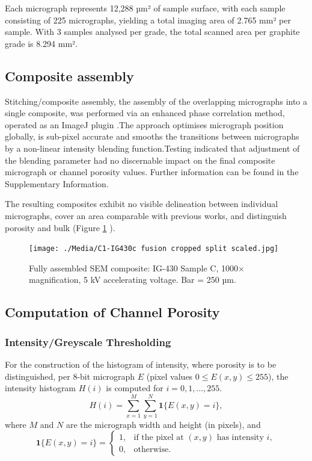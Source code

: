 \documentclass[review]{elsarticle}
\begin{document}
Each micrograph represents 12,288 µm² of sample surface, with each sample
consisting of 225 micrographs, yielding a total imaging area of 2.765 mm² per
sample. With 3 samples analysed per grade, the total scanned area per graphite
grade is 8.294 mm². 

\subsection{Composite assembly}

Stitching/composite assembly, the assembly of the overlapping micrographs into a
single composite, was performed via an enhanced phase correlation method,
operated as an ImageJ plugin \citep{ Preibisch2009}.The approach optimises
micrograph position globally, is sub-pixel accurate and smooths the transitions
between micrographs by a non-linear intensity blending function.Testing
indicated that adjustment of the blending parameter had no discernable impact on
the final composite micrograph or channel porosity values. Further information
can be found in the Supplementary Information.

The resulting composites exhibit no visible delineation between individual
micrographs, cover an area comparable with previous works, and distinguish
porosity and bulk (Figure \ref{fig:IG430C split scaled}
\citep{Huang2019,Kane2011a,huang2021statistical}). 

	\begin{figure}
		\centering
		\texttt{[image: ./Media/C1-IG430c fusion cropped split scaled.jpg]}
		\caption{Fully assembled SEM composite: IG-430 Sample C, 1000×  magnification,
     5 kV accelerating voltage. Bar = 250 µm.}
		\label{fig:IG430C split scaled}
	\end{figure} 

\subsection{Computation of Channel Porosity}
\subsubsection{Intensity/Greyscale Thresholding}

For the construction of the histogram of intensity, where porosity is to be
distinguished, per 8-bit micrograph \(E\) (pixel values \(0 \le E(x,y) \le 255\)),
the intensity histogram \(H(i)\) is computed for \(i=0,1,\dots,255\).
\[
H(i) = \sum_{x=1}^{M}\sum_{y=1}^{N} \mathbf{1}\{E(x,y)=i\},
\]
where \(M\) and \(N\) are the micrograph width and height (in pixels), and
\[
\mathbf{1}\{E(x,y)=i\} =
\begin{cases}
1, & \text{if the pixel at }(x,y)\text{ has intensity }i,\\
0, & \text{otherwise.}
\end{cases}
\]
\end{document}
